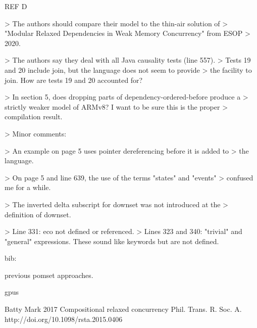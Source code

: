 \documentclass[acmsmall,review,screen]{acmart}\settopmatter{printfolios=true}
\theoremstyle{acmdefinition}
\begin{document}
REF D

> The authors should compare their model to the thin-air solution of
> "Modular Relaxed Dependencies in Weak Memory Concurrency" from ESOP
> 2020.

> The authors say they deal with all Java causality tests (line 557).
> Tests 19 and 20 include join, but the language does not seem to provide
> the facility to join. How are tests 19 and 20 accounted for?

> In section 5, does dropping parts of dependency-ordered-before produce a
> strictly weaker model of ARMv8? I want to be sure this is the proper
> compilation result.


> Minor comments:

> An example on page 5 uses pointer dereferencing before it is added to
> the language.

> On page 5 and line 639, the use of the terms "states" and "events"
> confused me for a while.

> The inverted delta subscript for downset was not introduced at the
> definition of downset.


> Line 331: eco not defined or referenced.
> Lines 323 and 340: "trivial" and "general" expressions. These sound like keywords but are not defined.




bib:

\cite{DBLP:journals/lmcs/KavanaghB19} previous pomset approaches.

\cite{10.1145/2694344.2694391} gpus

Batty Mark 2017
Compositional relaxed concurrency
Phil. Trans. R. Soc. A.
http://doi.org/10.1098/rsta.2015.0406
\end{document}
